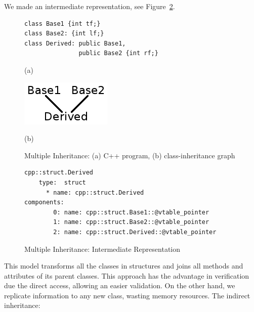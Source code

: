\documentclass[a4paper]{llncs}
\begin{document}
We made an intermediate representation, see Figure~\ref{figure:multiple-inheritance-IR}.

\begin{figure}[h]

\begin{minipage}[b]{.6\linewidth}
\begin{lstlisting}
class Base1 {int tf;}
class Base2: {int lf;}
class Derived: public Base1,
               public Base2 {int rf;}
\end{lstlisting}
  \centerline{(a)}\medskip
\end{minipage}
\label{figure:multiple-inheritance-code}
%
\begin{minipage}[b]{.48\linewidth}
  \centering
  \centerline{\includegraphics[scale=0.5]{figures/multiple_inheritance_graph}}
  \centerline{(b)}\medskip
\end{minipage}
%
\caption{Multiple Inheritance: (a) C++ program, (b) class-inheritance graph}
\label{fig:multiple-inheritance-graph}
\end{figure}


\begin{figure}[h]
\centering
\begin{minipage}{0.9\textwidth}
\begin{lstlisting}[style=nonumbers]
cpp::struct.Derived
    type:  struct
      * name: cpp::struct.Derived
components:
        0: name: cpp::struct.Base1::@vtable_pointer
        1: name: cpp::struct.Base2::@vtable_pointer
        2: name: cpp::struct.Derived::@vtable_pointer
\end{lstlisting}
\end{minipage}
\caption{Multiple Inheritance: Intermediate Representation}
\label{figure:multiple-inheritance-IR}
\end{figure}

This model transforms all the classes in structures and joins all methods and attributes of its parent classes.  This approach has the advantage in verification due the direct access, allowing an easier validation. On the other hand, we replicate information to any new class, wasting memory resources.
The indirect inheritance:
\end{document}

